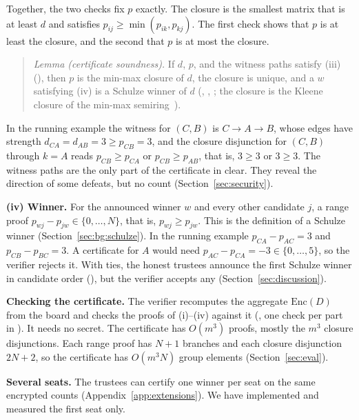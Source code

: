 Together, the two checks fix $p$ exactly. The closure is the smallest
matrix that is at least $d$ and satisfies $p_{ij} \ge \min(p_{ik},
p_{kj})$. The first check shows that $p$ is at least the closure, and
the second that $p$ is at most the closure.
\begin{quote}
  \emph{Lemma (certificate soundness).} If $d$, $p$, and the witness paths
  satisfy (iii) (), then $p$ is the min-max closure of $d$, the closure is
  unique, and a $w$ satisfying (iv) is a Schulze winner of $d$
  (, ,
  ; the closure is the Kleene closure of the min-max
  semiring~\cite{10.1007/978-3-319-66107-0_26}).
\end{quote}
In the running example the witness for $(C, B)$ is $C \to A \to B$, whose
edges have strength $d_{CA} = d_{AB} = 3 \ge p_{CB} = 3$, and the closure
disjunction for $(C, B)$ through $k = A$ reads $p_{CB} \ge p_{CA}$ or
$p_{CB} \ge p_{AB}$, that is, $3 \ge 3$ or $3 \ge 3$. The witness paths
are the only part of the certificate in clear. They reveal the direction
of some defeats, but no count (Section~\ref{sec:security}).

\textbf{(iv) Winner.} For the announced winner $w$ and every other
candidate $j$, a range proof $p_{wj} - p_{jw} \in \{0, \ldots, N\}$, that
is, $p_{wj} \ge p_{jw}$. This is the definition of a Schulze winner
(Section~\ref{sec:bg:schulze}). In the running example $p_{CA} - p_{AC} =
3$ and $p_{CB} - p_{BC} = 3$. A certificate for $A$ would need $p_{AC} -
p_{CA} = -3 \in \{0, \ldots, 5\}$, so the verifier rejects it. With
ties, the honest trustees announce the first Schulze winner in candidate
order (), but the verifier accepts any
(Section~\ref{sec:discussion}).

\textbf{Checking the certificate.} The verifier recomputes the aggregate
$\mathrm{Enc}(D)$ from the board and checks the proofs of (i)--(iv)
against it (, one check per part in
). It needs no secret. The certificate has $O(m^3)$
proofs, mostly the $m^3$ closure disjunctions. Each range proof has $N +
1$ branches and each closure disjunction $2N + 2$, so the certificate
has $O(m^3 N)$ group elements (Section~\ref{sec:eval}).

\textbf{Several seats.} The trustees can certify one winner per seat on
the same encrypted counts (Appendix~\ref{app:extensions}). We have
implemented and measured the first seat only.

